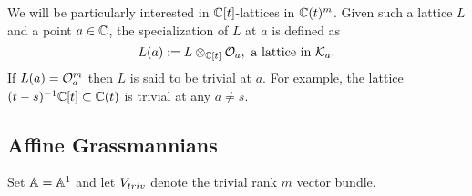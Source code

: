 \documentclass[draft]{article}
\begin{document}
We will be particularly interested in $\CC[t]$-lattices in $ \CC(t)^m$.  Given such a lattice $ L $ and a point $ a \in \CC$, the specialization of $ L $ at $ a $ is defined as
$$
L(a) := L \otimes_{\CC[t]} \cO_a, \text{ a lattice in } \cK_a.  %
$$
If 
$L(a) = \cO_a^m$ then $L$ is said to be trivial at $a$. 
For example, the lattice $(t-s)^{-1}\CC[t] \subset \CC(t)$ is trivial at any $a\ne s$. 






\subsection{Affine Grassmannians} %
Set $\AA = \AA^1$ and let $\Vtriv$ denote the trivial rank $ m $ vector bundle. 

\end{document}
